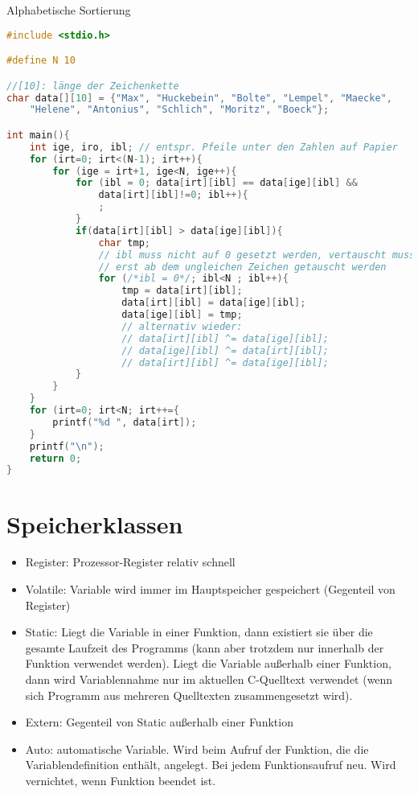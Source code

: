 \documentclass{scrreprt}
\begin{document}
Alphabetische Sortierung

\begin{lstlisting}[language=C]
#include <stdio.h>

#define N 10

//[10]: länge der Zeichenkette
char data[][10] = {"Max", "Huckebein", "Bolte", "Lempel", "Maecke", 
	"Helene", "Antonius", "Schlich", "Moritz", "Boeck"};

int main(){
	int ige, iro, ibl; // entspr. Pfeile unter den Zahlen auf Papier
	for (irt=0; irt<(N-1); irt++){
		for (ige = irt+1, ige<N, ige++){
			for (ibl = 0; data[irt][ibl] == data[ige][ibl] && 
				data[irt][ibl]!=0; ibl++){
				;
			}
			if(data[irt][ibl] > data[ige][ibl]){
				char tmp;
				// ibl muss nicht auf 0 gesetzt werden, vertauscht muss sowieso
				// erst ab dem ungleichen Zeichen getauscht werden
				for (/*ibl = 0*/; ibl<N ; ibl++){
					tmp = data[irt][ibl];
					data[irt][ibl] = data[ige][ibl];
					data[ige][ibl] = tmp;
					// alternativ wieder:
					// data[irt][ibl] ^= data[ige][ibl];
					// data[ige][ibl] ^= data[irt][ibl];
					// data[irt][ibl] ^= data[ige][ibl];
			}
		}	
	}
	for (irt=0; irt<N; irt++={
		printf("%d ", data[irt]);
	}
	printf("\n");
	return 0;
}
\end{lstlisting}

\chapter{Speicherklassen}
\begin{itemize}
\item Register: Prozessor-Register relativ schnell
\item Volatile: Variable wird immer im Hauptspeicher gespeichert (Gegenteil von Register)
\item Static: Liegt die Variable in einer Funktion, dann existiert sie über die gesamte Laufzeit des Programms (kann aber trotzdem nur innerhalb der Funktion verwendet werden). Liegt die Variable außerhalb einer Funktion, dann wird Variablennahme nur im aktuellen C-Quelltext verwendet (wenn sich Programm aus mehreren Quelltexten zusammengesetzt wird).
\item Extern: Gegenteil von Static außerhalb einer Funktion
\item Auto: automatische Variable. Wird beim Aufruf der Funktion, die die Variablendefinition enthält, angelegt. Bei jedem Funktionsaufruf neu. Wird vernichtet, wenn Funktion beendet ist.
\end{itemize}
\end{document}
